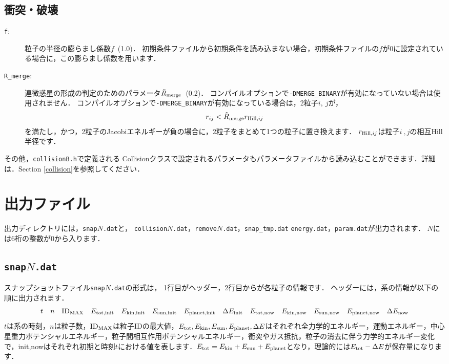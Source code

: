 \documentclass[12pt,a4paper,dvipdfmx]{jsarticle}
\begin{document}
\subsection{衝突・破壊}
\begin{description}
\item[\texttt{f}:]
粒子の半径の膨らまし係数$f$\ (1.0)．
初期条件ファイルから初期条件を読み込まない場合，初期条件ファイルの$f$が0に設定されている場合に，この膨らまし係数を用います．
\item[\texttt{R\_merge}:]
連微惑星の形成の判定のためのパラメータ$\tilde{R}_{\rm merge}$\ (0.2)．
コンパイルオプションで\texttt{-DMERGE\_BINARY}が有効になっていない場合は使用されません．
コンパイルオプションで\texttt{-DMERGE\_BINARY}が有効になっている場合は，2粒子$i,\ j$が，
\begin{equation}
r_{ij} < \tilde{R}_{\rm merge}r_{{\rm Hill},ij}
\end{equation}
を満たし，かつ，2粒子のJacobiエネルギーが負の場合に，2粒子をまとめて1つの粒子に置き換えます．
$r_{{\rm Hill},ij}$は粒子$i\ ,j$の相互Hill半径です．
\end{description}

その他，\texttt{collisionB.h}で定義される Collisionクラスで設定されるパラメータもパラメータファイルから読み込むことができます．詳細は．Section \ref{collision}を参照してください．


\section{出力ファイル\label{output}}

出力ディレクトリには，\texttt{snap}$N$\texttt{.dat}と，
\texttt{collision}$N$\texttt{.dat}，\texttt{remove}$N$\texttt{.dat}，\texttt{snap\_tmp.dat}
\texttt{energy.dat}，\texttt{param.dat}が出力されます．
$N$には6桁の整数が0から入ります．

\subsection{\texttt{snap}$N$\texttt{.dat}\label{snap}}
スナップショットファイル\texttt{snap}$N$\texttt{.dat}の形式は，
1行目がヘッダー，2行目からが各粒子の情報です．
ヘッダーには，系の情報が以下の順に出力されます．
\[
t\quad n\quad {\rm ID}_{\rm MAX}\quad E_{\rm tot,init}\quad E_{\rm kin,init}\quad E_{\rm sun,init}\quad E_{\rm planet,init}\quad \Delta E_{\rm init}
\quad E_{\rm tot,now}\quad E_{\rm kin,now}\quad E_{\rm sun,now}\quad E_{\rm planet,now}\quad \Delta E_{\rm now}
\]
$t$は系の時刻，$n$は粒子数，${\rm ID}_{\rm MAX}$は粒子IDの最大値，$E_{\rm tot},E_{\rm kin},E_{\rm sun}, E_{\rm planet},\Delta E$はそれぞれ全力学的エネルギー，運動エネルギー，中心星重力ポテンシャルエネルギー，粒子間相互作用ポテンシャルエネルギー，衝突やガス抵抗，粒子の消去に伴う力学的エネルギー変化で，init,nowはそれぞれ初期と時刻$t$における値を表します．$E_{\rm tot} = E_{\rm kin} + E_{\rm sun} + E_{\rm planet}$となり，理論的には$E_{\rm tot}-\Delta E$が保存量になります．
\end{document}
